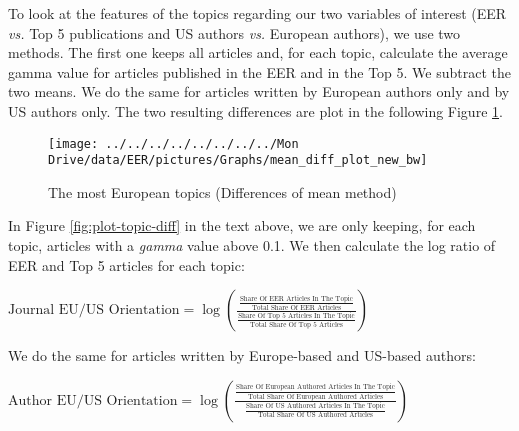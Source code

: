 \documentclass[
  12pt,
  onecolumn]{article}
\begin{document}
To look at the features of the topics regarding our two variables of
interest (EER \emph{vs.} Top 5 publications and US authors \emph{vs.}
European authors), we use two methods. The first one keeps all articles
and, for each topic, calculate the average gamma value for articles
published in the EER and in the Top 5. We subtract the two means. We do
the same for articles written by European authors only and by US authors
only. The two resulting differences are plot in the following Figure
\ref{fig:plot-topic-diff-alternative}.

\begin{figure}[h]

{\centering \texttt{[image: ../../../../../../../../Mon Drive/data/EER/pictures/Graphs/mean\_diff\_plot\_new\_bw]} 

}

\caption{The most European topics (Differences of mean method)}\label{fig:plot-topic-diff-alternative}
\end{figure}

In Figure \ref{fig:plot-topic-diff} in the text above, we are only
keeping, for each topic, articles with a \emph{gamma} value above 0.1.
We then calculate the log ratio of EER and Top 5 articles for each
topic:

\bigskip

\({\scriptstyle \text{Journal EU/US Orientation}=\log(\frac{\frac{\text{Share Of EER Articles In The Topic}}{\text{Total Share Of EER Articles}}} {\frac{\text{Share Of Top 5 Articles In The Topic}}{\text{Total Share Of Top 5 Articles}}})}\)

\bigskip

We do the same for articles written by Europe-based and US-based
authors:

\bigskip

\({\scriptstyle \text{Author EU/US Orientation}=\log(\frac{\frac{\text{Share Of European Authored Articles In The Topic}}{\text{Total Share Of European Authored Articles}}} {\frac{\text{Share Of US Authored Articles In The Topic}}{\text{Total Share Of US Authored Articles}}})}\)
\end{document}
